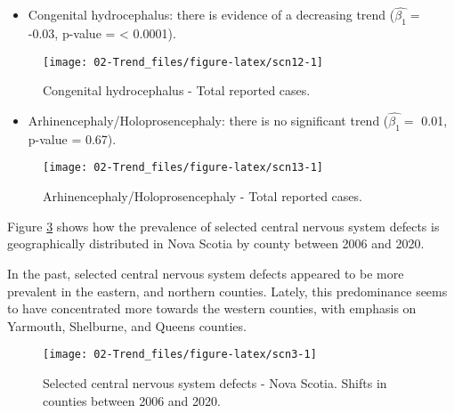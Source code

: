 \documentclass[
]{krantz}
\providecommand{\tightlist}{%
  \setlength{\itemsep}{0pt}\setlength{\parskip}{0pt}}
\begin{document}
\begin{itemize}
\tightlist
\item
  Congenital hydrocephalus: there is evidence of a decreasing trend (\(\hat{\beta_{1}} =\) -0.03, p-value = \textless{} 0.0001).
\end{itemize}

\begin{figure}[h]

{\centering \texttt{[image: 02-Trend\_files/figure-latex/scn12-1]} 

}

\caption{Congenital hydrocephalus - Total reported cases.}\label{fig:scn12}
\end{figure}

\begin{itemize}
\tightlist
\item
  Arhinencephaly/Holoprosencephaly: there is no significant trend (\(\hat{\beta_{1}} =\) 0.01, p-value = 0.67).
\end{itemize}

\begin{figure}[h]

{\centering \texttt{[image: 02-Trend\_files/figure-latex/scn13-1]} 

}

\caption{Arhinencephaly/Holoprosencephaly - Total reported cases.}\label{fig:scn13}
\end{figure}

Figure \ref{fig:scn3} shows how the prevalence of selected central nervous system defects is geographically distributed in Nova Scotia by county between 2006 and 2020.

In the past, selected central nervous system defects appeared to be more prevalent in the eastern, and northern counties. Lately, this predominance seems to have concentrated more towards the western counties, with emphasis on Yarmouth, Shelburne, and Queens counties.

\begin{figure}[h]

{\centering \texttt{[image: 02-Trend\_files/figure-latex/scn3-1]} 

}

\caption{Selected central nervous system defects - Nova Scotia. Shifts in counties between 2006 and 2020.}\label{fig:scn3}
\end{figure}

\clearpage
\end{document}
